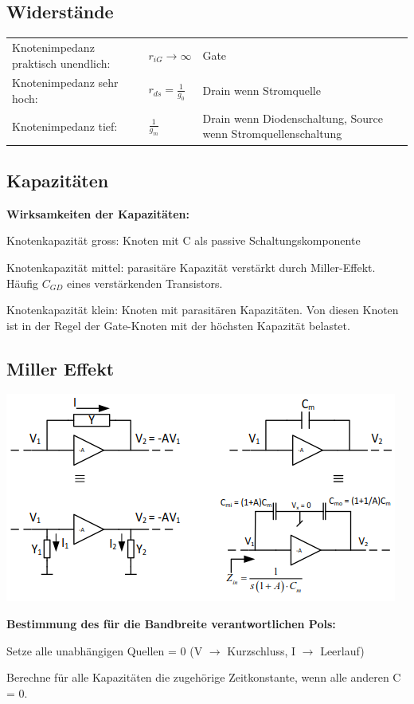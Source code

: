 \subsection{Widerstände}
\begin{tabular}{lll}
	Knotenimpedanz praktisch unendlich: &$r_{iG}\rightarrow \infty$ & Gate \\
	Knotenimpedanz sehr hoch: &$r_{ds} = \frac{1}{g_0}$ & Drain wenn Stromquelle\\
	Knotenimpedanz tief: &$\frac{1}{g_m}$ & Drain wenn Diodenschaltung, Source wenn Stromquellenschaltung \\
\end{tabular}
\subsection{Kapazitäten}
\textbf{Wirksamkeiten der Kapazitäten:}
\begin{compactenum}
	\item Knotenkapazität gross: Knoten mit C als passive Schaltungskomponente
	\item Knotenkapazität mittel: parasitäre Kapazität verstärkt durch Miller-Effekt. Häufig $C_{GD}$ eines verstärkenden Transistors.
	\item Knotenkapazität klein: Knoten mit parasitären Kapazitäten. Von diesen Knoten ist in der Regel der Gate-Knoten mit der höchsten Kapazität belastet.
\end{compactenum}
\subsection{Miller Effekt}
\begin{minipage}[c]{0.5\textwidth}
	\includegraphics[width=1\linewidth]{chapters/Frequenzverhalten/images/miller}
\end{minipage}
\begin{minipage}[c]{0.5\textwidth}
	\textbf{Bestimmung des für die Bandbreite verantwortlichen Pols:}
	\begin{compactenum}
		\item Setze alle unabhängigen Quellen = 0 (V $\rightarrow$ Kurzschluss, I $\rightarrow$ Leerlauf)
		\item Berechne für alle Kapazitäten die zugehörige Zeitkonstante, wenn alle anderen C = 0.
	\end{compactenum}
\end{minipage}